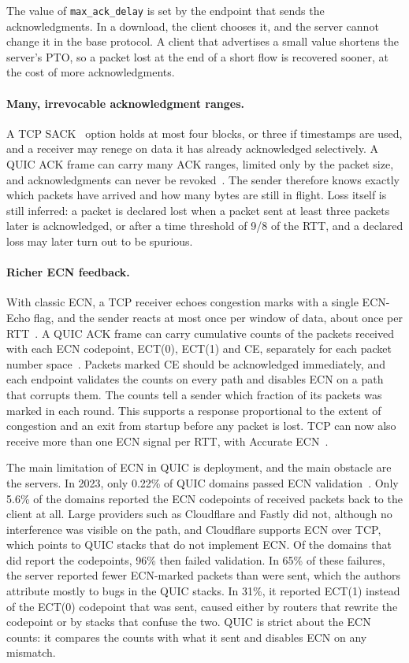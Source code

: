 The value of \texttt{max\_ack\_delay} is set by the endpoint that sends the
acknowledgments. In a download, the
client chooses it, and the server cannot change it in the base protocol. A client
that advertises a small value shortens the server's PTO, so a packet lost at the end
of a short flow is recovered sooner, at the cost of more acknowledgments.



\paragraph{Many, irrevocable acknowledgment ranges.} A TCP SACK~\cite{rfc2018} option holds at most
four blocks, or three if timestamps are used, and a receiver may renege on data it has
already acknowledged selectively. A QUIC ACK frame can carry many ACK
ranges, limited only by the packet size, and acknowledgments can never be
revoked~\cite{rfc9002}. The sender therefore knows exactly which packets have
arrived and how many bytes are still in flight. Loss itself is still inferred: a
packet is declared lost when a packet sent at least three packets later is
acknowledged, or after a time threshold of 9/8 of the RTT, and a
declared loss may later turn out to be spurious.

\paragraph{Richer ECN feedback.} With classic ECN, a TCP receiver echoes congestion marks with a single
ECN-Echo flag, and the sender reacts at most once per window of data, about once per
RTT~\cite{rfc3168}. A
QUIC ACK frame can carry cumulative counts of the packets received with each ECN
codepoint, ECT(0), ECT(1) and CE, separately for each packet number
space~\cite{rfc9000}. Packets marked CE should be acknowledged immediately, and each
endpoint validates the counts on every path and disables ECN on a path that
corrupts them. The counts tell a sender which fraction of its packets
was marked in each round. This supports a response proportional to the extent of
congestion and an exit from startup before any packet is lost. TCP can now also
receive more than one ECN signal per RTT, with Accurate ECN~\cite{rfc9768}.

The main limitation of ECN in QUIC is deployment,
and the main obstacle are the servers. In 2023, only 0.22\% of QUIC
domains passed ECN validation~\cite{sander2023ecn}. Only 5.6\% of the domains
reported the ECN codepoints of received packets back to the client at all. Large
providers such as Cloudflare and Fastly did not, although no interference was visible
on the path, and Cloudflare supports ECN over TCP, which points to QUIC stacks that
do not implement ECN. Of the domains that did report the codepoints, 96\% then failed
validation. In 65\% of these failures, the server reported fewer ECN-marked packets
than were sent, which the authors attribute mostly to bugs in the QUIC stacks. In
31\%, it reported ECT(1) instead of the ECT(0) codepoint that was sent, caused either
by routers that rewrite the codepoint or by stacks that confuse the
two. QUIC is strict about the ECN counts: it compares the counts with what it sent and disables ECN on any mismatch.

